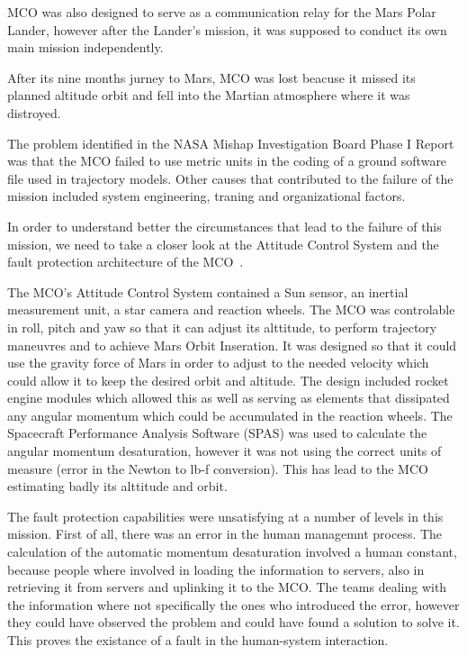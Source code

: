 MCO was also designed to serve as a communication relay for the Mars Polar
Lander, however after the Lander's mission, it was supposed to conduct its own
main mission independently.

After its nine months jurney to Mars, MCO was lost beacuse it missed its planned
altitude orbit and fell into the Martian atmosphere where it was distroyed.

The problem identified in the NASA Mishap Investigation Board Phase I
Report~\cite{mco-rep} was that the MCO failed to use metric units in the coding
of a ground software file used in trajectory models. Other causes that
contributed to the failure of the mission included system engineering, traning
and organizational factors.

In order to understand better the circumstances that lead to the failure of this
mission, we need to take a closer look at the Attitude Control System and
the fault protection architecture of the MCO~\cite{surv-nasa-mars}.

The MCO's Attitude Control System contained a Sun sensor, an inertial
measurement unit, a star camera and reaction wheels. The MCO was controlable in
roll, pitch and yaw so that it can adjust its alttitude, to perform trajectory
maneuvres and to achieve Mars Orbit Inseration. It was designed so that it could
use the gravity force of Mars in order to adjust to the needed velocity which
could allow it to keep the desired orbit and altitude. The design included
rocket engine modules which allowed this as well as serving as elements that
dissipated any angular momentum which could be accumulated in the reaction
wheels. The Spacecraft Performance Analysis Software (SPAS) was used to
calculate the angular momentum desaturation, however it was not using the
correct units of measure (error in the Newton to lb-f conversion). This has lead
to the MCO estimating badly its alttitude and orbit.

The fault protection capabilities were unsatisfying at a number of levels in
this mission. First of all, there was an error in the human managemnt process.
The calculation of the automatic momentum desaturation involved a human
constant, because people where involved in loading the information to servers,
also in retrieving it from servers and uplinking it to the MCO. The teams
dealing with the information where not specifically the ones who introduced the
error, however they could have observed the problem and could have found a
solution to solve it. This proves the existance of a fault in the human-system
interaction. 

